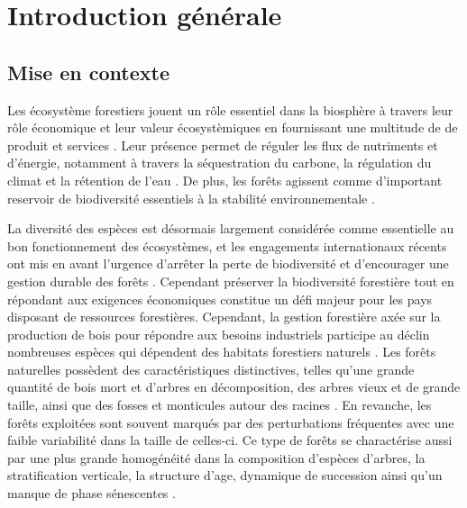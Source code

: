 \chapter*{Introduction générale}         %
\label{chap-introduction}       %


\section*{Mise en contexte}
\label{sec:contexte}


Les écosystème forestiers jouent un rôle essentiel dans la biosphère à travers leur rôle économique et leur valeur écosystèmiques en fournissant une multitude de de produit et services \citep{Balvanera2006Quantifyingevidence}. 
Leur présence permet de réguler les flux de nutriments et d'énergie, notamment à travers la séquestration du carbone, la régulation du climat et la rétention de l'eau \citep{Balvanera2006Quantifyingevidence,Canadell2008Managingforests,Pawson2013Plantationforests}. 
De plus, les forêts agissent comme d'important reservoir de biodiversité essentiels à la stabilité environnementale \citep{Diaz2006BiodiversityLoss}. 

La diversité des espèces est désormais largement considérée comme essentielle au bon fonctionnement des écosystèmes, et les engagements internationaux récents ont mis en avant l'urgence d'arrêter la perte de biodiversité et d'encourager une gestion durable des forêts \citep{Scherer-Lorenzen2005ForestDiversity,Parviainen2007Maintenanceconservation}. 
Cependant préserver la biodiversité forestière tout en répondant aux exigences économiques constitue un défi majeur pour les pays disposant de ressources forestières.
Cependant, la gestion forestière axée sur la production de bois pour répondre aux besoins industriels participe au déclin nombreuses espèces qui dépendent des habitats forestiers naturels \citep{Bengtsson2000Biodiversitydisturbances}. 
Les forêts naturelles possèdent des caractéristiques distinctives, telles qu'une grande quantité de bois mort et d'arbres en décomposition, des arbres vieux et de grande taille, ainsi que des fosses et monticules autour des racines \citep{Spies1999Dynamicforest}. 
En revanche, les forêts exploitées sont souvent marqués par des perturbations fréquentes avec une faible variabilité dans la taille de celles-ci. 
Ce type de forêts se charactérise aussi par une plus grande homogénéité dans la composition d'espèces d'arbres, la stratification verticale, la structure d'age, dynamique de succession ainsi qu'un manque de phase sénescentes \citep{Commarmot2005Structurevirgin}.


